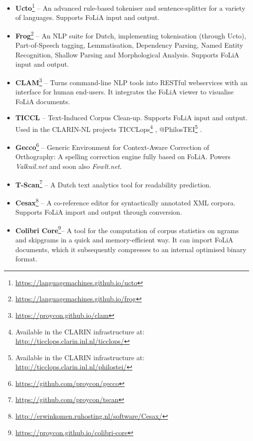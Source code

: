 \documentclass[a4paper,11pt]{article}
\begin{document}
\begin{itemize}
\item \textbf{\textbf{Ucto}}\footnote{\url{https://languagemachines.github.io/ucto}} -- An advanced rule-based tokeniser and sentence-splitter for a variety of
    languages. Supports FoLiA
    input and output. \cite{UCTO}
\item \textbf{\textbf{Frog}}\footnote{\url{https://languagemachines.github.io/frog}} -- An NLP suite for Dutch, implementing tokenisation (through
    Ucto), Part-of-Speech tagging, Lemmatisation, Dependency Parsing, Named
    Entity Recognition, Shallow Parsing and Morphological Analysis. Supports
    FoLiA input and output.
\item \textbf{\textbf{CLAM}}\footnote{\url{https://proycon.github.io/clam}} -- Turns command-line NLP tools into RESTful webservices with an
    interface for human end-users. It integrates the FoLiA viewer to visualise
    FoLiA documents. \cite{CLAM}
\item \textbf{\textbf{TICCL}} -- Text-Induced Corpus Clean-up. Supports FoLiA
    input and output. Used in the
    CLARIN-NL projects TICCLops\footnote{Available in the CLARIN infrastructure at: \url{http://ticclops.clarin.inl.nl/ticclops/}} \cite{Reynaert2010}, @PhilosTEI\footnote{Available in the CLARIN infrastructure at: \url{http://ticclops.clarin.inl.nl/philostei/}} \cite{Reynaert2014b}. 
\item \textbf{\textbf{Gecco}}\footnote{\url{https://github.com/proycon/gecco}}  -- Generic Environment for Context-Aware Correction
    of Orthography: A spelling correction engine fully based on FoLiA. Powers
    \emph{Valkuil.net} and soon also \emph{Fowlt.net}.
\item \textbf{\textbf{T-Scan}}\footnote{\url{https://github.com/proycon/tscan}} -- A Dutch text analytics tool for readability
    prediction. \cite{TSCAN}
\item \textbf{\textbf{Cesax}}\footnote{\url{http://erwinkomen.ruhosting.nl/software/Cesax/}} -- A co-reference editor for syntactically annotated XML corpora.
    Supports FoLiA import and output through conversion. 
\item \textbf{\textbf{Colibri Core}}\footnote{\url{https://proycon.github.io/colibri-core}}-- A tool for the computation
    of corpus statistics on ngrams and skipgrams in a quick and
    memory-efficient way. It can import FoLiA documents, which it subsequently
    compresses to an internal optimised binary format.
\end{itemize}
\end{document}

